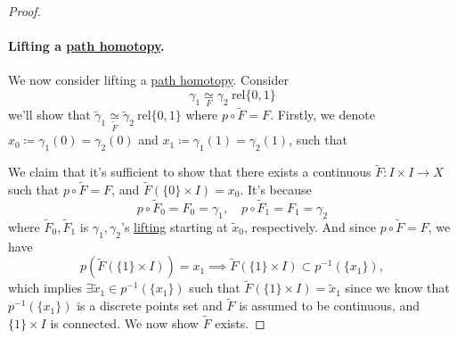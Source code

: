 \begin{proof}
	\paragraph{Lifting a \hyperref[def:homotopy-path]{path homotopy}.} We now consider lifting a \hyperref[def:homotopy-path]{path homotopy}. Consider
	\[
		\gamma _1\underset{F}{\simeq } \gamma _2 \ \mathrm{rel} \{0, 1\}
	\]
	we'll show that \(\widetilde{\gamma}_1\underset{\widetilde{F} }{\simeq} \widetilde{\gamma}_2 \ \mathrm{rel} \{0, 1\}\) where \(p\circ \widetilde{F} = F\). Firstly,
	we denote \(x_0\coloneqq\gamma _1(0) = \gamma _2(0)\) and \(x_1\coloneqq \gamma _1(1) = \gamma _2(1)\), such that
	\begin{figure}[H]
		\centering
		\label{fig:pf:col:lec14-4}
	\end{figure}
	We claim that it's sufficient to show that there exists a continuous \(\widetilde{F} \colon I\times I\to X\) such that \(p\circ \widetilde{F} = F\), and \(\widetilde{F} (\{0\}\times I)= x_0\).
	It's because
	\[
		p\circ \widetilde{F} _0 = F_0 = \gamma _1,\quad p\circ \widetilde{F} _1= F_1= \gamma _2
	\]
	where \(\widetilde{F} _0, \widetilde{F} _1\) is \(\gamma _1, \gamma _2\)'s \hyperref[prop:homotopy-lifting-property]{lifting} starting at \(\widetilde{x} _0\), respectively. And since
	\(p\circ\widetilde{F} = F\), we have
	\[
		p\left(\widetilde{F} (\{1\}\times I)\right) = x_1 \implies \widetilde{F} (\{1\}\times I)\subset p^{-1} (\{x_1\}),
	\]
	which implies \(\exists \widetilde{x} _1 \in p^{-1} (\{x_1\})\) such that \(\widetilde{F} (\{1\}\times I) = \widetilde{x} _1\) since we know that \(p^{-1} (\{x_1\})\) is a discrete
	points set and \(\widetilde{F} \) is assumed to be continuous, and \(\{1\}\times I\) is connected. We now show \(\widetilde{F} \) exists.


\end{proof}
